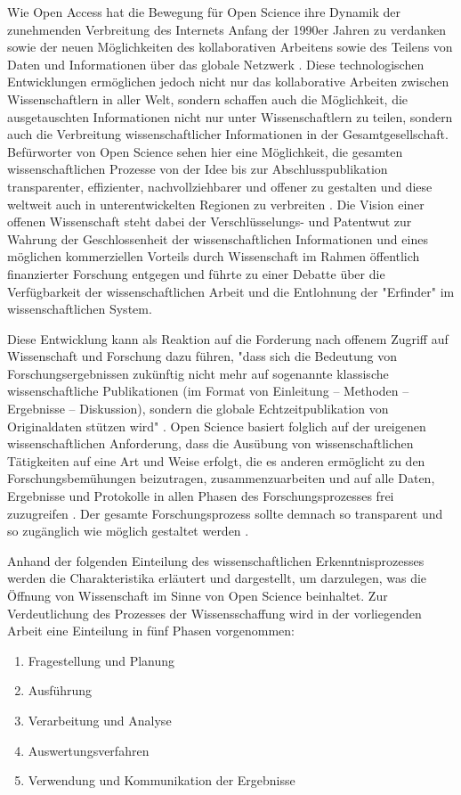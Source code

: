 Wie Open Access hat die Bewegung für Open Science ihre Dynamik der zunehmenden Verbreitung des Internets Anfang der 1990er Jahren zu verdanken \cite{Lievrouw_2010} sowie der neuen Möglichkeiten des kollaborativen Arbeitens sowie des Teilens von Daten und Informationen über das globale Netzwerk \cite{Meyer_2013}. Diese technologischen Entwicklungen ermöglichen jedoch nicht nur das kollaborative Arbeiten zwischen Wissenschaftlern in aller Welt, sondern schaffen auch die Möglichkeit, die ausgetauschten Informationen nicht nur unter Wissenschaftlern zu teilen, sondern auch die Verbreitung wissenschaftlicher Informationen in der Gesamtgesellschaft. Befürworter von Open Science sehen hier eine Möglichkeit, die gesamten wissenschaftlichen Prozesse von der Idee bis zur Abschlusspublikation transparenter, effizienter, nachvollziehbarer und offener zu gestalten \cite{Woelfle_2011} und diese weltweit auch in unterentwickelten Regionen zu verbreiten \cite{yiotis_2013_open}. Die Vision einer offenen Wissenschaft steht dabei der Verschlüsselungs- und Patentwut zur Wahrung der Geschlossenheit der wissenschaftlichen Informationen und eines möglichen kommerziellen Vorteils durch Wissenschaft im Rahmen öffentlich finanzierter Forschung entgegen und führte zu einer Debatte über die Verfügbarkeit der wissenschaftlichen Arbeit und die Entlohnung der "Erfinder" im wissenschaftlichen System.

Diese Entwicklung kann als Reaktion auf die Forderung nach offenem Zugriff auf Wissenschaft und Forschung dazu führen, "dass sich die Bedeutung von Forschungsergebnissen zukünftig nicht mehr auf sogenannte klassische wissenschaftliche Publikationen (im Format von Einleitung – Methoden – Ergebnisse – Diskussion), sondern die globale Echtzeitpublikation von Originaldaten stützen wird" \cite{Stengel_2013}. Open Science basiert folglich auf der ureigenen wissenschaftlichen Anforderung, dass die Ausübung von wissenschaftlichen Tätigkeiten auf eine Art und Weise erfolgt, die es anderen ermöglicht zu den Forschungsbemühungen beizutragen, zusammenzuarbeiten und auf alle Daten, Ergebnisse und Protokolle in allen Phasen des Forschungsprozesses frei zuzugreifen \cite{RIN_2010_open_research}. Der gesamte Forschungsprozess sollte demnach so transparent und so zugänglich wie möglich gestaltet werden \cite{Scheliga_2014}.

Anhand der folgenden Einteilung des wissenschaftlichen Erkenntnisprozesses werden die Charakteristika erläutert und dargestellt, um darzulegen, was die Öffnung von Wissenschaft im Sinne von Open Science beinhaltet. Zur Verdeutlichung des Prozesses der Wissensschaffung wird in der vorliegenden Arbeit eine Einteilung in fünf Phasen vorgenommen:
\begin{enumerate}
\item Fragestellung und Planung
\item Ausführung
\item Verarbeitung und Analyse
\item Auswertungsverfahren
\item Verwendung und Kommunikation der Ergebnisse
\end{enumerate}

